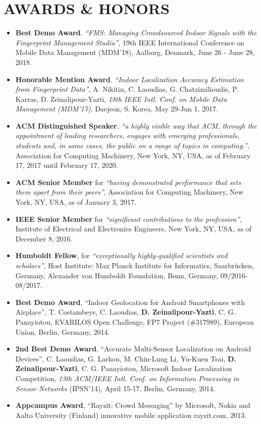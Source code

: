 \documentclass[10pt]{article}
\begin{document}
\section{\bf AWARDS \& HONORS}
\setlength{\itemsep}{0.10ex}
\begin{itemize}
\item {\bf  Best Demo Award}. {\em ``FMS: Managing Crowdsourced Indoor Signals with the Fingerprint Management Studio''}, 19th IEEE International Conference on Mobile Data Management (MDM'18), Aalborg, Denmark, June 26 - June 28, 2018.
\item {\bf Honorable Mention Award}. {\em ``Indoor Localization Accuracy Estimation from Fingerprint Data''}, A. Nikitin, C. Laoudias, G. Chatzimilioudis, P. Karras, D. Zeinalipour-Yazti, {\em 18th IEEE Intl. Conf. on Mobile Data Management (MDM'17)}, Daejeon, S. Korea, May 29-Jun 1, 2017.
\item {\bf ACM Distinguished Speaker}.  {\em ``a highly visible way that ACM, through the appointment of leading researchers, engages with emerging professionals, students and, in some cases, the public on a range of topics in computing.''}, Association for Computing Machinery, New York, NY, USA, as of February 17, 2017 until February 17, 2020.
\item {\bf ACM Senior Member}  for {\em ``having demonstrated performance that sets them apart from their peers''}, Association for Computing Machinery, New York, NY, USA, as of January 3, 2017.
\item {\bf IEEE Senior Member}  for {\em ``significant contributions to the profession''}, Institute of Electrical and Electronics Engineers, 	New York, NY, USA, as of December 8, 2016.
\item {\bf Humboldt Fellow}, for {\em ``exceptionally highly-qualified scientists and scholars''}, Host Institute: Max Planck Institute for Informatics, Saarbr{\"u}cken, Germany,  Alexander von Humboldt Foundation, Bonn, Germany, 09/2016-08/2017.
\item {\bf Best Demo Award}, ``Indoor Geolocation for Android Smartphones with Airplace'', T. Costambeys, C. Laoudias, {\bf D. Zeinalipour-Yazti}, C. G. Panayiotou, EVARILOS Open Challenge, FP7 Project (\#317989), European Union, Berlin, Germany, 2014.
\item  {\bf 2nd Best Demo Award}, ``Accurate Multi-Sensor Localization on Android Devices'', C. Laoudias, G. Larkou, M. Chin-Lung Li, Yu-Kuen Tsai, {\bf D. Zeinalipour-Yazti}, C. G. Panayiotou, Microsoft Indoor Localization Competition, {\em 13th ACM/IEEE Intl. Conf. on Information Processing in Sensor Networks} (IPSN'14), April 15-17, Berlin, Germany, 2014.
\item  {\bf Appcampus Award}, ``Rayzit: Crowd Messaging'' by Microsoft, Nokia and Aalto University (Finland) innovative mobile application rayzit.com, 2013.


\end{itemize}
\end{document}
